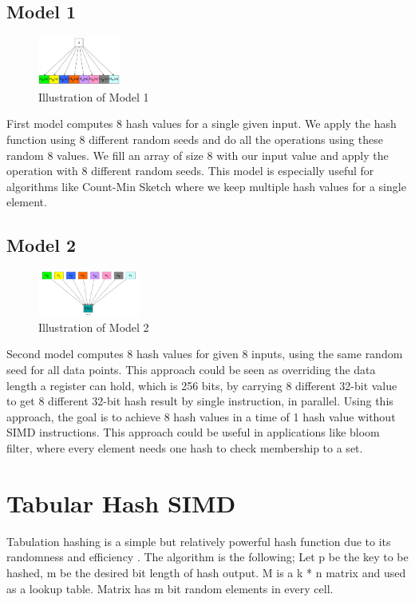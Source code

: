 \documentclass[a0,portrait]{a0poster}
\begin{document}
\begin{minipage}[c]{\linewidth}
\begin{framed}
\begin{multicols}{2}
\subsection{Model 1}
\begin{figure}[H]
\centering
\includegraphics[width=0.24\textwidth]{one_data_multi_hash.png} 
\caption{Illustration of Model 1}
\end{figure}
First model computes 8 hash values for a single given input. We apply the hash function using 8 different random seeds and do all the operations using these random 8 values. We fill an array of size 8 with our input value and apply the operation with 8 different random seeds. This model is especially useful for algorithms like Count-Min Sketch where we keep multiple hash values for a single element. 
\subsection{Model 2}
\begin{figure}[H]
\centering
\includegraphics[width=0.3\textwidth]{multi_data_single_hash.png} 
\caption{Illustration of Model 2}
\end{figure}
Second model computes 8 hash values for given 8 inputs, using the same random seed for all data points. This approach could be seen as overriding the data length a register can hold, which is 256 bits, by carrying 8 different 32-bit value to get 8 different 32-bit hash result by single instruction, in parallel. Using this approach, the goal is to achieve 8 hash values in a time of 1 hash value without SIMD instructions. This approach could be useful in applications like bloom filter, where every element needs one hash to check membership to a set.


\section{Tabular Hash SIMD}
Tabulation hashing is a simple but relatively powerful hash function due to its randomness and efficiency \cite{DBLP:journals/corr/abs-1011-5200}. The algorithm is the
following;
Let p be the key to be hashed, m be the desired bit length of hash output. M is a k * n
matrix and used as a lookup table. Matrix has m bit random elements in every cell.
%


\end{multicols}
\end{framed}
\end{minipage}
\end{document}
